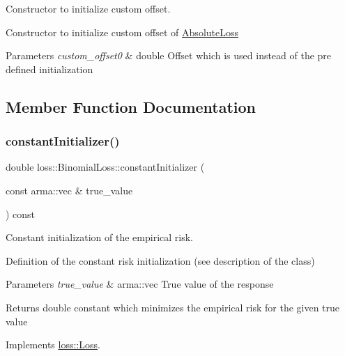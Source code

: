 Constructor to initialize custom offset. 

Constructor to initialize custom offset of {\ttfamily \hyperlink{classloss_1_1_absolute_loss}{Absolute\+Loss}}


\begin{DoxyParams}{Parameters}
{\em custom\+\_\+offset0} & {\ttfamily double} Offset which is used instead of the pre defined initialization \\
\hline
\end{DoxyParams}


\subsection{Member Function Documentation}
\mbox{\label{classloss_1_1_binomial_loss_a1292422a2b07c8ebe1b168375940b029}} 
\subsubsection{\texorpdfstring{constant\+Initializer()}{constantInitializer()}}
{\footnotesize\ttfamily double loss\+::\+Binomial\+Loss\+::constant\+Initializer (\begin{DoxyParamCaption}\item[{const arma\+::vec \&}]{true\+\_\+value }\end{DoxyParamCaption}) const\hspace{0.3cm}{\ttfamily [virtual]}}



Constant initialization of the empirical risk. 

Definition of the constant risk initialization (see description of the class)


\begin{DoxyParams}{Parameters}
{\em true\+\_\+value} & {\ttfamily arma\+::vec} True value of the response\\
\hline
\end{DoxyParams}
\begin{DoxyReturn}{Returns}
{\ttfamily double} constant which minimizes the empirical risk for the given true value 
\end{DoxyReturn}


Implements \hyperlink{classloss_1_1_loss_a65fe7dcd9370e6a549b8d1cc95fc8798}{loss\+::\+Loss}.

